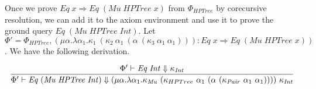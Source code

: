 \documentclass{llncs}
\newcommand{\Conid}[1]{\mathit{#1}}
\newcommand{\Varid}[1]{\mathit{#1}}
\begin{document}
\noindent Once we prove \ensuremath{\Conid{Eq}\;\Varid{x}\Rightarrow \Conid{Eq}\;(\Conid{Mu}\;\Conid{HPTree}\;\Varid{x})} from $\Phi_{\ensuremath{\Conid{HPTree}}}$ by corecursive resolution, we can add it to the
axiom environment and use it to prove the ground query \ensuremath{\Conid{Eq}\;(\Conid{Mu}\;\Conid{HPTree}\;\Conid{Int})}. Let $\Phi' = \Phi_{\ensuremath{\Conid{HPTree}}}, (\mu \alpha . \lambda \alpha_1 . \kappa_1\ (\kappa_2\ \alpha_1\  (\alpha\ (\kappa_3\ \alpha_1\ \alpha_1))) : \ensuremath{\Conid{Eq}\;\Varid{x}\Rightarrow \Conid{Eq}\;(\Conid{Mu}\;\Conid{HPTree}\;\Varid{x})})$. We have the following derivation. 

{\small
\[
\begin{array}{c}
  \infer{\Phi' \vdash \ensuremath{\Conid{Eq}\;(\Conid{Mu}\;\Conid{HPTree}\;\Conid{Int})} \Downarrow (\mu \alpha . \lambda \alpha_1 . \kappa_{\ensuremath{\Conid{Mu}}}\ (\kappa_{HPTree}\ \alpha_1\  (\alpha\ (\kappa_{\ensuremath{\Conid{Pair}}}\ \alpha_1\ \alpha_1)))) \
    \kappa_{\ensuremath{\Conid{Int}}}} {\Phi' \vdash \ensuremath{\Conid{Eq}\;\Conid{Int}} \Downarrow \kappa_{\ensuremath{\Conid{Int}}}}
\end{array}
\]
}



\begin{comment}
  We begin with initial environment $\Phi \vdash \{{Eq}\ x \Rightarrow
  {Eq}\ ({Mu}\ {HPTree}\ x)\}$. By preprocessing, we have $\Phi'
  \vdash \{ {Eq}\ ({Mu}\ {HPTree}\ C)\}$, where $\Phi' = \Phi, \alpha
  : {Eq}\ x \Rightarrow {Eq}\ ({Mu}\ {HPTree}\ x), \alpha_1 : {Eq}\ C$
  and $C$ is an constant. Thus we have the following corecursive
  resolution.


  {\footnotesize
    \begin{center}
      $\Phi' \vdash \{ {Eq}\ ({Mu}\ {HPTree}\ {C})\} \to_{\kappa_1} \{
      {Eq}\ ({HPTree} \ ({Mu}\ {HPTree})\ {C}) \}
      \to_{\kappa_2}\{{Eq}\ {C}, {Eq}\ ({Mu}\ {HPTree}\ ({Pair}\ {C}\
      {C}))\} \to_{\alpha_1} \{ {Eq}\ ({Mu}\ {HPTree}\ ({Pair}\ {C}\
      {C}))\} \to_\alpha \{ {Eq}\ ({Pair}\ {C}\ {C})\} \to_{\kappa_3}
      \{{Eq}\ {C}, {Eq}\ {C} \} \to_{\alpha_1} \{{Eq}\ {C}\}
      \to_{\alpha_1} \emptyset$
    \end{center}
  }

  \noindent By theorem \ref{corec:thm}, we obtain the following
  corecursive evidence:


  \noindent $(\alpha : {Eq}\ x \Rightarrow {Eq}\ ({Mu}\ {HPTree}\ x))
  \mapsto \lambda \alpha_1 . \kappa_1\ (\kappa_2\ \alpha_1 \ (\alpha \
  (\kappa_3 \ \alpha_1 \ \alpha_1)))$.

\end{comment}
\end{document}
